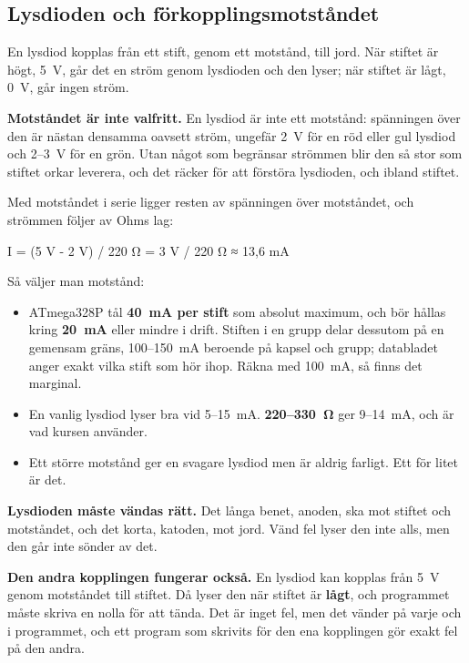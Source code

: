 \subsection{Lysdioden och förkopplingsmotståndet}
\label{c11:a2}
En lysdiod kopplas från ett stift, genom ett motstånd, till jord. När stiftet är högt, 5~V, går det
en ström genom lysdioden och den lyser; när stiftet är lågt, 0~V, går ingen ström.


\textbf{Motståndet är inte valfritt.} En lysdiod är inte ett motstånd: spänningen över den är nästan
densamma oavsett ström, ungefär 2~V för en röd eller gul lysdiod och 2--3~V för en grön. Utan något
som begränsar strömmen blir den så stor som stiftet orkar leverera, och det räcker för att förstöra
lysdioden, och ibland stiftet.

Med motståndet i serie ligger resten av spänningen över motståndet, och strömmen följer av Ohms
lag:

\begin{textdrawing}
I = (5 V - 2 V) / 220 Ω = 3 V / 220 Ω ≈ 13,6 mA
\end{textdrawing}

\noindent Så väljer man motstånd:
\begin{itemize}
  \item ATmega328P tål \textbf{40~mA per stift} som absolut maximum, och bör hållas kring
    \textbf{20~mA} eller mindre i drift. Stiften i en grupp delar dessutom på en gemensam gräns,
    100--150~mA beroende på kapsel och grupp; databladet anger exakt vilka stift som hör ihop.
    Räkna med 100~mA, så finns det marginal.
  \item En vanlig lysdiod lyser bra vid 5--15~mA. \textbf{220--330~Ω} ger 9--14~mA, och är vad
    kursen använder.
  \item Ett större motstånd ger en svagare lysdiod men är aldrig farligt. Ett för litet är det.
\end{itemize}

\textbf{Lysdioden måste vändas rätt.} Det långa benet, anoden, ska mot stiftet och motståndet, och
det korta, katoden, mot jord. Vänd fel lyser den inte alls, men den går inte sönder av det.

\textbf{Den andra kopplingen fungerar också.} En lysdiod kan kopplas från 5~V genom motståndet till
stiftet. Då lyser den när stiftet är \textbf{lågt}, och programmet måste skriva en nolla för att
tända. Det är inget fel, men det vänder på varje  och  i programmet, och ett
program som skrivits för den ena kopplingen gör exakt fel på den andra.

